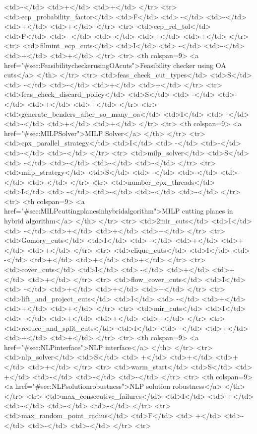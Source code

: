 {{<td>-</td>
<td>+</td>
<td>+</td>
</tr>
<tr>
<td>ecp_probability_factor</td>
<td>F</td>
<td> -</td>
<td>-</td>
<td>+</td>
<td>+</td>
</tr>
<tr>
<td>ecp_rel_tol</td>
<td>F</td>
<td> -</td>
<td>-</td>
<td>+</td>
<td>+</td>
</tr>
<tr>
<td>filmint_ecp_cuts</td>
<td>I</td>
<td> -</td>
<td>-</td>
<td>+</td>
<td>+</td>
</tr>
<tr>   <th colspan=9> <a href="#sec:FeasibilitycheckerusingOAcuts">Feasibility checker using OA cuts</a> </th>
</tr>
<tr>
<td>feas_check_cut_types</td>
<td>S</td>
<td> -</td>
<td>-</td>
<td>+</td>
<td>+</td>
</tr>
<tr>
<td>feas_check_discard_policy</td>
<td>S</td>
<td> -</td>
<td>-</td>
<td>+</td>
<td>+</td>
</tr>
<tr>
<td>generate_benders_after_so_many_oa</td>
<td>I</td>
<td> -</td>
<td>-</td>
<td>+</td>
<td>+</td>
</tr>
<tr>   <th colspan=9> <a href="#sec:MILPSolver">MILP Solver</a> </th>
</tr>
<tr>
<td>cpx_parallel_strategy</td>
<td>I</td>
<td> -</td>
<td>-</td>
<td>-</td>
<td>-</td>
</tr>
<tr>
<td>milp_solver</td>
<td>S</td>
<td> -</td>
<td>-</td>
<td>-</td>
<td>-</td>
</tr>
<tr>
<td>milp_strategy</td>
<td>S</td>
<td> -</td>
<td>-</td>
<td>-</td>
<td>-</td>
</tr>
<tr>
<td>number_cpx_threads</td>
<td>I</td>
<td> -</td>
<td>-</td>
<td>-</td>
<td>-</td>
</tr>
<tr>   <th colspan=9> <a href="#sec:MILPcuttingplanesinhybridalgorithm">MILP cutting planes in hybrid algorithm</a> </th>
</tr>
<tr>
<td>2mir_cuts</td>
<td>I</td>
<td> -</td>
<td>+</td>
<td>+</td>
<td>+</td>
</tr>
<tr>
<td>Gomory_cuts</td>
<td>I</td>
<td> -</td>
<td>+</td>
<td>+</td>
<td>+</td>
</tr>
<tr>
<td>clique_cuts</td>
<td>I</td>
<td> -</td>
<td>+</td>
<td>+</td>
<td>+</td>
</tr>
<tr>
<td>cover_cuts</td>
<td>I</td>
<td> -</td>
<td>+</td>
<td>+</td>
<td>+</td>
</tr>
<tr>
<td>flow_cover_cuts</td>
<td>I</td>
<td> -</td>
<td>+</td>
<td>+</td>
<td>+</td>
</tr>
<tr>
<td>lift_and_project_cuts</td>
<td>I</td>
<td> -</td>
<td>+</td>
<td>+</td>
<td>+</td>
</tr>
<tr>
<td>mir_cuts</td>
<td>I</td>
<td> -</td>
<td>+</td>
<td>+</td>
<td>+</td>
</tr>
<tr>
<td>reduce_and_split_cuts</td>
<td>I</td>
<td> -</td>
<td>+</td>
<td>+</td>
<td>+</td>
</tr>
<tr>   <th colspan=9> <a href="#sec:NLPinterface">NLP interface</a> </th>
</tr>
<tr>
<td>nlp_solver</td>
<td>S</td>
<td> +</td>
<td>+</td>
<td>+</td>
<td>+</td>
</tr>
<tr>
<td>warm_start</td>
<td>S</td>
<td> +</td>
<td>-</td>
<td>-</td>
<td>-</td>
</tr>
<tr>   <th colspan=9> <a href="#sec:NLPsolutionrobustness">NLP solution robustness</a> </th>
</tr>
<tr>
<td>max_consecutive_failures</td>
<td>I</td>
<td> +</td>
<td>-</td>
<td>-</td>
<td>-</td>
</tr>
<tr>
<td>max_random_point_radius</td>
<td>F</td>
<td> +</td>
<td>-</td>
<td>-</td>
<td>-</td>
</tr>
<tr>
}}
